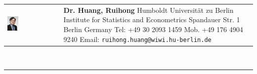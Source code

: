 \documentclass[a4paper,10pt]{article}
\begin{document}
\newcommand{\HU}[0]{Humboldt Universit\"at zu Berlin}
\fancyhf{}
\renewcommand{\headrulewidth}{0pt}
\renewcommand{\footrulewidth}{1pt}
\renewcommand\footrule{\begin{minipage}{1\textwidth}
\hrule width \hsize height 2pt \kern 1mm \hrule width \hsize   
\end{minipage}\par}
\pagestyle{fancy}
\begin{tabular}[h]{p{}p{}}
  \vfill\hspace{-10pt}\includegraphics[width=0.22\textwidth]{bew/ruihong_2013.jpg} &\vspace{1pt}\large{\textbf{Dr. Huang, Ruihong}\newline
  \vspace{-8pt} \newline
Humboldt Universit\"at zu Berlin \newline 
Institute for Statistics and Econometrics  ­\newline
Spandauer Str. 1  \newline
10178 Berlin\newline
Germany \newline
Tel: +49 30 2093 1459 \newline
Mob. +49 176 4904 9240 \newline
Email: \verb|ruihong.huang@wiwi.hu-berlin.de| } \\
\end{tabular}\\
\rule[5pt]{1\textwidth}{1pt}\par
\setlength{\tabcolsep}{10pt}
\setlength{\extrarowheight}{6pt}
\end{document}
